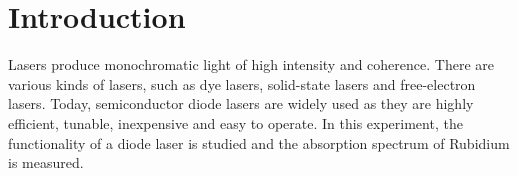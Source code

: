 \section*{Introduction}
Lasers produce monochromatic light of high intensity and coherence. There are various kinds 
of lasers, such as dye lasers, solid-state lasers and free-electron lasers.
Today, semiconductor diode lasers are widely used as they are highly efficient, tunable, 
inexpensive and easy to operate. In this experiment, the 
functionality of a diode laser is studied and the absorption spectrum of Rubidium is measured.